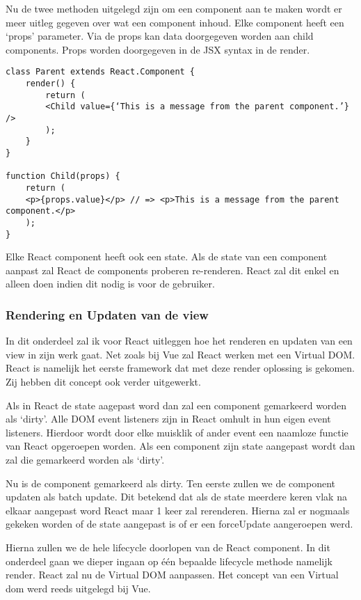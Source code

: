 Nu de twee methoden uitgelegd zijn om een component aan te maken wordt er meer uitleg gegeven over wat een component inhoud. Elke component heeft een ‘props’ parameter. Via de props kan data doorgegeven worden aan child components. Props worden doorgegeven in de JSX syntax in de render.

\begin{verbatim}
class Parent extends React.Component {
	render() {
		return (
		<Child value={‘This is a message from the parent component.’} />
		);
	}
}

function Child(props) {
	return (
	<p>{props.value}</p> // => <p>This is a message from the parent component.</p>
	);
}
\end{verbatim}

Elke React component heeft ook een state. Als de state van een component aanpast zal React de components proberen re-renderen. React zal dit enkel en alleen doen indien dit nodig is voor de gebruiker.

\subsubsection{Rendering en Updaten van de view}
\label{sec:React_Rendering_Updaten}
In dit onderdeel zal ik voor React uitleggen hoe het renderen en updaten van een view in zijn werk gaat. Net zoals bij Vue zal React werken met een Virtual DOM. React is namelijk het eerste framework dat met deze render oplossing is gekomen. Zij hebben dit concept ook verder uitgewerkt.

Als in React de state aagepast word dan zal een component gemarkeerd worden als ‘dirty’. Alle DOM event listeners zijn in React omhult in hun eigen event listeners. Hierdoor wordt door elke muisklik of ander event een naamloze functie van React opgeroepen worden. Als een component zijn state aangepast wordt dan zal die gemarkeerd worden als ‘dirty’.

Nu is de component gemarkeerd als dirty. Ten eerste zullen we de component updaten als batch update. Dit betekend dat als de state meerdere keren vlak na elkaar aangepast word React maar 1 keer zal rerenderen. Hierna zal er nogmaals gekeken worden of de state aangepast is of er een forceUpdate aangeroepen werd.

Hierna zullen we de hele lifecycle doorlopen van de React component. In dit onderdeel gaan we dieper ingaan op één bepaalde lifecycle methode namelijk render. React zal nu de Virtual DOM aanpassen. Het concept van een Virtual dom werd reeds uitgelegd bij Vue.

